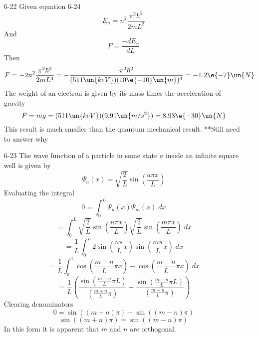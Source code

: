 \documentclass[]{2620hw}
\begin{document}
\begin{enumerate}
\begin{enumerate}
\end{enumerate}

\item [6-22]
	Given equation 6-24
	\[
		E_n = n^2 \frac{\pi^2 \hbar^2}{2mL^2}
	\]
	And 
	\[
		F = \frac{-dE_n}{dL}
	\]
	Then
	\[
		F = -2 n^2 \frac{\pi^2 \hbar^2}{2mL^3} = -\frac{\pi^2 \hbar^2}{(511\un{keV})(10\e{-10}\un{m})^3} = -1.2 \e{-7}\un{N}
	\]
	The weight of an electron is given by its mass times the acceleration of gravity
	\[
		F = mg = (511\un{keV})(9.91\un{m/s^2}) = 8.93\e{-30}\un{N} 
	\]
	This result is much smaller than the quantum mechanical result. **Still need to answer why

\item [6-23]
The wave function of a particle in some state $a$ inside an infinite square well is given by 
\[
	\Psi_a(x) =\sqrt{\frac{2}{L}} \sin{\left( \frac{a\pi x}{L} \right)}
\]
Evaluating the integral
\[
	0 = \int_0^L \Psi_n(x) \Psi_m(x) \; dx
\]
\[
	= \int_0^L \sqrt{\frac{2}{L}} \sin{\left( \frac{n\pi x}{L} \right)} \sqrt{\frac{2}{L}} \sin{\left( \frac{m\pi x}{L} \right)} \; dx
\]
\[
	= \frac{1}{L}\int_0^L 2\sin{\left( \frac{n\pi}{L}x \right)}\sin{\left( \frac{m\pi}{L}x \right)} \; dx
\]
\[
	= \frac{1}{L} \int_0^1 \cos{ \left( \frac{m+n}{L} \pi x \right) } - \cos{ \left( \frac{m-n}{L} \pi x \right) } \; dx
\]
\[
	= \frac{1}{L}\left( \frac{\sin{\left( \frac{m+n}{L} \pi L \right)}}{\left( \frac{m+n}{L} \pi \right)} - \frac{\sin{\left( \frac{m-n}{L} \pi L \right)}}{\left( \frac{m-n}{L} \pi \right)} \right)
\]
Clearing denominators
\[
	0 = \sin{((m+n)\pi)} - \sin{((m-n)\pi)}
\]
\[
	\sin{((m+n)\pi)} = \sin{((m-n)\pi)}
\]
In this form it is apparent that $m$ and $n$ are orthogonal.

\end{enumerate}
\end{document}
